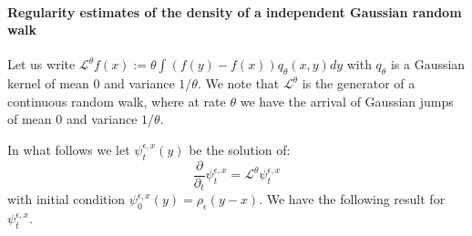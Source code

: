 \documentclass[12pt]{article}
\begin{document}
\paragraph{Regularity estimates of the density of a independent Gaussian random walk}
Let us write $\mathcal{L}^\theta f(x) := \theta \int (f(y)-f(x))q_\theta(x,y) dy$ with $q_\theta$ is a Gaussian kernel of mean $0$ and variance $1/\theta$. We note that $\mathcal{L}^\theta$ is the generator of a continuous random walk, where at rate $\theta$ we have the arrival of Gaussian jumps of mean $0$ and variance $1/\theta$.

In what follows we let $\psi_t^{\epsilon, x}(y)$ be the solution of:
\begin{equation} \frac{\partial}{ \partial_t} \psi_t^{\epsilon,x} = \mathcal{L}^\theta \psi_t^{\epsilon, x} \label{AlmostHeatEquation} \end{equation}
with initial condition $\psi_0^{\epsilon,x}(y) = \rho_\epsilon(y-x)$. We have the following result for $\psi_t^{\epsilon,x}$.
\end{document}
